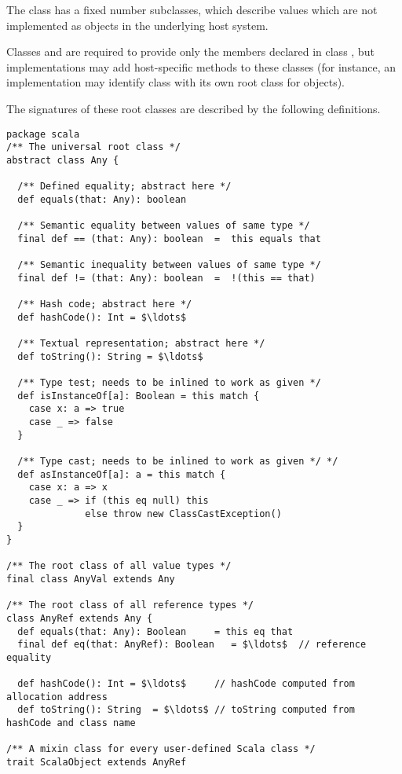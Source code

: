 {The class  has a fixed number subclasses, which describe
values which are not implemented as objects in the underlying host
system.

Classes  and  are required to provide only
the members declared in class , but implementations may add
host-specific methods to these classes (for instance, an
implementation may identify class  with its own root
class for objects).

The signatures of these root classes are described by the following
definitions.

\begin{lstlisting}
package scala 
/** The universal root class */
abstract class Any {

  /** Defined equality; abstract here */
  def equals(that: Any): boolean 

  /** Semantic equality between values of same type */
  final def == (that: Any): boolean  =  this equals that

  /** Semantic inequality between values of same type */
  final def != (that: Any): boolean  =  !(this == that)

  /** Hash code; abstract here */
  def hashCode(): Int = $\ldots$

  /** Textual representation; abstract here */
  def toString(): String = $\ldots$

  /** Type test; needs to be inlined to work as given */
  def isInstanceOf[a]: Boolean = this match {
    case x: a => true
    case _ => false
  }

  /** Type cast; needs to be inlined to work as given */ */
  def asInstanceOf[a]: a = this match {
    case x: a => x
    case _ => if (this eq null) this
              else throw new ClassCastException()
  }
}

/** The root class of all value types */
final class AnyVal extends Any 

/** The root class of all reference types */
class AnyRef extends Any {
  def equals(that: Any): Boolean     = this eq that 
  final def eq(that: AnyRef): Boolean   = $\ldots$  // reference equality
  
  def hashCode(): Int = $\ldots$     // hashCode computed from allocation address
  def toString(): String  = $\ldots$ // toString computed from hashCode and class name

/** A mixin class for every user-defined Scala class */
trait ScalaObject extends AnyRef 
\end{lstlisting}

}

